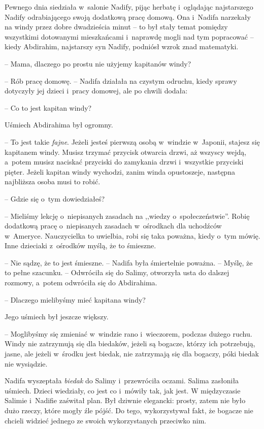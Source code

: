 \documentclass[oneside,polish,11pt,sfheadings]{mwbk}
\begin{document}
Pewnego dnia siedziała w~salonie Nadify, pijąc herbatę i~oglądając
najstarszego Nadify odrabiającego swoją dodatkową pracę domową. Ona i~Nadifa narzekały na windy przez dobre dwadzieścia minut -- to był stały
temat pomiędzy wszystkimi dotowanymi mieszkańcami i~naprawdę mogli nad
tym popracować -- kiedy Abdirahim, najstarszy syn Nadify, podniósł wzrok
znad matematyki.

-- Mama, dlaczego po prostu nie użyjemy kapitanów windy?

-- Rób pracę domowę. -- Nadifa działała na czystym odruchu, kiedy sprawy
dotyczyły jej dzieci i~pracy domowej, ale po chwili dodała: 

-- Co to jest kapitan windy?

Uśmiech Abdirahima był ogromny. 

-- To jest takie \textit{fajne}. Jeżeli
jesteś pierwszą osobą w~windzie w~Japonii, stajesz się kapitanem windy.
Musisz trzymać przycisk otwarcia drzwi, aż wszyscy wejdą, a~potem musisz
naciskać przyciski do zamykania drzwi i~wszystkie przyciski pięter.
Jeżeli kapitan windy wychodzi, zanim winda opustoszeje, następna
najbliższa osoba musi to robić.

-- Gdzie się o~tym dowiedziałeś?

-- Mieliśmy lekcję o~niepisanych zasadach na ,,wiedzy o~społeczeństwie''.
Robię dodatkową pracę o~niepisanych zasadach w~ośrodkach dla uchodźców w~Ameryce. Nauczycielka to uwielbia, robi się taka poważna, kiedy o~tym
mówię. Inne dzieciaki z~ośrodków myślą, że to śmieszne.

-- Nie sądzę, że to jest śmieszne. -- Nadifa była śmiertelnie poważna. -- Myślę, że to pełne szacunku. -- Odwróciła się do Salimy, otworzyła usta
do dalszej rozmowy, a~potem odwróciła się do Abdirahima. 

-- Dlaczego
mielibyśmy mieć kapitana windy?

Jego uśmiech był jeszcze większy. 

-- Moglibyśmy się zmieniać w~windzie
rano i~wieczorem, podczas dużego ruchu. Windy nie zatrzymują się dla
biedaków, jeżeli są bogacze, którzy ich potrzebują, jasne, ale jeżeli w~środku jest biedak, nie zatrzymają się dla bogaczy, póki biedak nie
wysiądzie.

Nadifa wyszeptała \textit{biedak} do Salimy i~przewróciła oczami. Salima
zasłoniła uśmiech. Dzieci wiedziały, co jest co i~mówiły tak, jak jest.
W międzyczasie Salimie i~Nadifie zaświtał plan. Był dziwnie elegancki:
prosty, zatem nie było dużo rzeczy, które mogły źle pójść. Do tego,
wykorzystywał fakt, że bogacze nie chcieli widzieć jednego ze swoich
wykorzystanych przeciwko nim.
\end{document}

